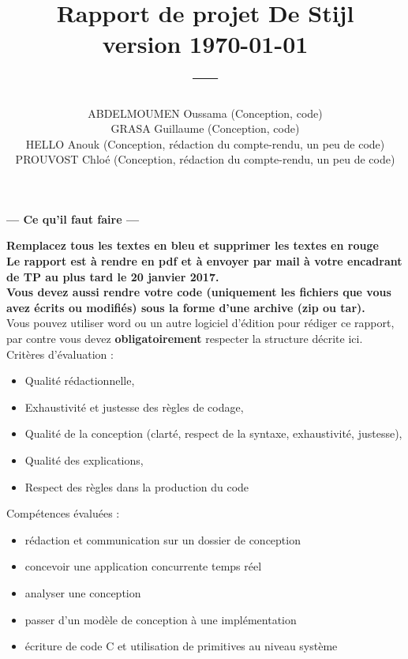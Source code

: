 \documentclass[11pt, a4paper]{paper}
\title{{\Huge Rapport de projet De Stijl}\\
{\large version \today}\\
---\\
}
\author{\color{black}
{ABDELMOUMEN Oussama (Conception, code)} \\ {GRASA Guillaume (Conception, code)}\\ {HELLO Anouk (Conception, rédaction du compte-rendu, un peu de code)} \\ {PROUVOST Chloé (Conception, rédaction du compte-rendu, un peu de code)}
}
\begin{document}
\maketitle


{\color{red}
\begin{framed}
\begin{center}{\bf\Large --- Ce qu'il faut faire --- } \end{center}

{\bf Remplacez tous les textes en bleu et supprimer les textes en rouge}\\


{\bf Le rapport est à rendre en pdf et à envoyer par mail à votre encadrant de TP au plus tard le 20 janvier 2017.}\\

{\bf Vous devez aussi rendre votre code (uniquement les fichiers que vous avez écrits ou modifiés) sous la forme d'une archive (zip ou tar).}\\

Vous pouvez utiliser word ou un autre logiciel d'édition pour rédiger ce rapport, par contre vous devez  {\bf obligatoirement} respecter la structure décrite ici.\\


Critères d'évaluation :
\begin{itemize}
	\item Qualité rédactionnelle,
	\item Exhaustivité et justesse des règles de codage,
	\item Qualité de la conception (clarté, respect de la syntaxe, exhaustivité, justesse),
	\item Qualité des explications,
	\item Respect des règles dans la production du code\\
\end{itemize}

Compétences évaluées :
\begin{itemize}
	\item rédaction et communication sur un dossier de conception
	\item concevoir une application concurrente temps réel
	\item analyser une conception
	\item passer d'un modèle de conception à une implémentation
	\item écriture de code C et utilisation de primitives au niveau système
\end{itemize}
\end{framed}
}
\end{document}
